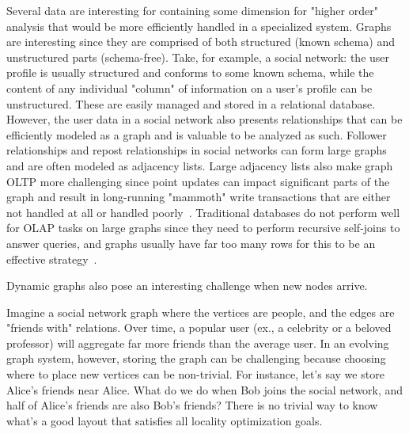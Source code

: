 Several data are interesting for containing some dimension for "higher order" analysis that would be more efficiently handled in a specialized system.
Graphs are interesting since they are comprised of both structured (known schema) and unstructured parts (schema-free). 
Take, for example, a social network: the user profile is usually structured and conforms to some known schema, while the content of any individual "column" of information on a user's profile can be unstructured.
These are easily managed and stored in a relational database.
However, the user data in a social network also presents relationships that can be efficiently modeled as a graph and is valuable to be analyzed as such.
Follower relationships and repost relationships in social networks can form large graphs and are often modeled as adjacency lists.
Large adjacency lists also make graph OLTP more challenging since point updates can impact significant parts of the graph and result in long-running "mammoth" write transactions that are either not handled at all or handled poorly~\cite{Cheng2024Mammoths}.
Traditional databases do not perform well for OLAP tasks on large graphs since they need to perform recursive self-joins to answer queries, and graphs usually have far too many rows for this to be an effective strategy~\cite{TransitiveClosure_Biskup_Stiefeling_1989}.

Dynamic graphs also pose an interesting challenge when new nodes arrive.




Imagine a social network graph where the vertices are people, and the edges are "friends with" relations.
Over time, a popular user (ex., a celebrity or a beloved professor) will aggregate far more friends than the average user.
In an evolving graph system, however, storing the graph can be challenging because choosing where to place new vertices can be non-trivial.
For instance, let's say we store Alice's friends near Alice. What do we do when Bob joins the social network, and half of Alice's friends are also Bob's friends?
There is no trivial way to know what's a good layout that satisfies all locality optimization goals.

